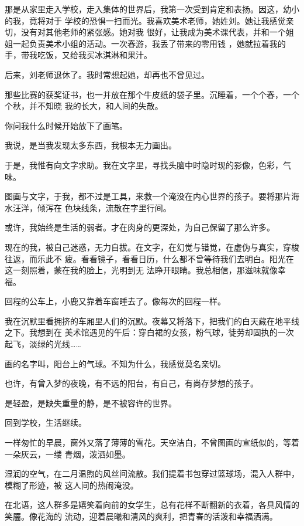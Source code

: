 \documentclass[12pt,a4paper]{article}
\begin{document}
		那是从家里走入学校，走入集体的世界后，我第一次受到肯定和表扬。因这，幼小的我，竟将对于
	学校的恐惧一扫而光。我喜欢美术老师，她姓刘。她让我感觉亲切，没有对其他老师的紧张感。她对我
	很好，让我成为美术课代表，并和一个姐姐一起负责美术小组的活动。一次春游，我丢了带来的零用钱
	，她就拉着我的手，带我吃饭，又给我买冰淇淋和果汁。

		后来，刘老师退休了。我时常想起她，却再也不曾见过。

		那些比赛的获奖证书，也一并放在那个牛皮纸的袋子里。沉睡着，一个个春，一个个秋，并不知晓
	我的长大，和人间的失散。

		你问我什么时候开始放下了画笔。

		我说，是当我发现太多东西，我根本无力画出。

		于是，我惟有向文字求助。我在文字里，寻找头脑中时隐时现的影像，色彩，气味。

		图画与文字，于我，都不过是工具，来救一个淹没在内心世界的孩子。要将那片海水汪洋，倾泻在
	色块线条，流散在字里行间。

		或许，我始终是生活的弱者。才在肉身的更深处，为自己保留了那么许多。

		现在的我，被自己迷惑，无力自拔。在文字，在幻觉与错觉，在虚伪与真实，穿梭往返，而乐此不
	疲。看看镜子，看看日历，什么都不曾等待我们去明白。阳光在这一刻照着，蒙在我的脸上，光明到无
	法睁开眼睛。我总相信，那滋味就像幸福。

		回程的公车上，小鹿又靠着车窗睡去了。像每次的回程一样。

		我在沉默里看拥挤的车厢里人们的沉默。夜幕又将落下，把我们的白天藏在地平线之下。我想到在
	美术馆遇见的午后：穿白裙的女孩，粉气球，徒劳却固执的一次起飞，淡绿的光线……

		画的名字叫，阳台上的气球。不知为什么，我感觉莫名亲切。

		也许，有曾入梦的夜晚，有不远的阳台，有自己，有尚存梦想的孩子。

		是轻盈，是缺失重量的静，是不被容许的世界。

	\endwriting



		回到学校，生活继续。

		一样匆忙的早晨，窗外又落了薄薄的雪花。天空洁白，不曾图画的宣纸似的，等着一朵灰云，一缕
	青烟，泼洒如墨。

		湿润的空气，在二月温煦的风丝间流散。我们提着书包穿过篮球场，混入人群中，模糊了形迹，被
	这人间的热闹淹没。

		在北语，这人群多是嬉笑着向前的女学生，总有花样不断翻新的衣着，各具风情的笑靥。像花海的
	流动，迎着晨曦和清风的爽利，把青春的活泼和幸福洒满。
\end{document}
